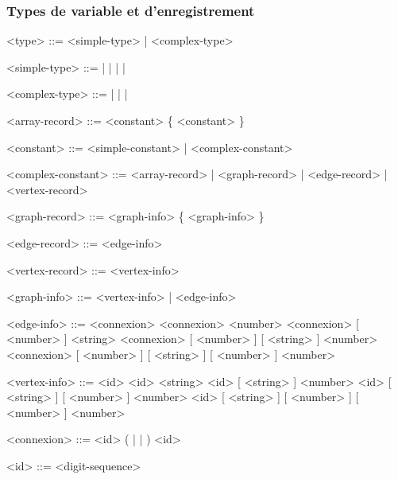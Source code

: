 \documentclass[french]{article}
\begin{document}
			\subsubsection{Types de variable et d'enregistrement}
				\begin{grammar}
					<type> ::= <simple-type> | <complex-type>
					
					<simple-type> ::=  |  |  |  | 
					
					<complex-type> ::=  |  |  | 
					
					<array-record> ::= \lit{[} <constant> \{ \lit{,} <constant> \} \lit{]}
					
					<constant> ::= <simple-constant> | <complex-constant>
					
					<complex-constant> ::= <array-record> | <graph-record> | <edge-record> | <vertex-record>
					
					<graph-record> ::= \lit{\{} <graph-info> \{ \lit{,} <graph-info> \} \lit{\}}
					
					<edge-record> ::= \lit{(} <edge-info> \lit{)}
					
					<vertex-record> ::=  \lit{)}
					
					<graph-info> ::= <vertex-info> | <edge-info>
					
					<edge-info> ::= <connexion> 
					\alt <connexion> \lit{:} <number>
					\alt <connexion> \lit{:} [ <number> ] \lit{:} <string>
					\alt <connexion> \lit{:} [ <number> ] \lit{:} [ <string> ] \lit{:} <number>
					\alt <connexion> \lit{:} [ <number> ] \lit{:} [ <string> ] \lit{:} [ <number> ] \lit{:} <number>
					
					<vertex-info> ::= <id> 
					\alt <id> \lit{:} <string>
					\alt <id> \lit{:} [ <string> ] \lit{:} <number>
					\alt <id> \lit{:} [ <string> ] \lit{:} [ <number> ] \lit{:} <number>
					\alt <id> \lit{:} [ <string> ] \lit{:} [ <number> ] \lit{:} [ <number> ] \lit{:} <number>
					
					<connexion> ::= <id> ( \lit{\textendash\textemdash} | \lit{\textemdash\textgreater} | \lit{\textless\textemdash} ) <id>
					
					<id> ::= <digit-sequence>
				\end{grammar}
		
\end{document}

